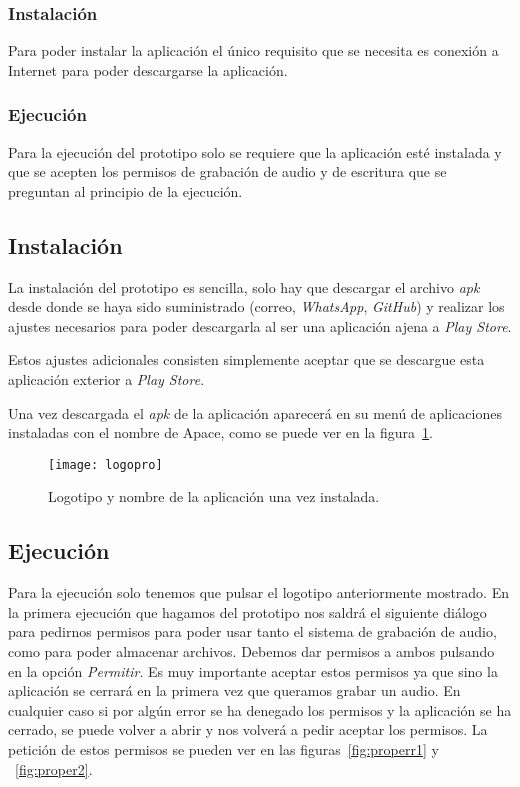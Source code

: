 \subsubsection{Instalación}
Para poder instalar la aplicación el único requisito que se necesita es conexión a Internet para poder descargarse la aplicación.

\subsubsection{Ejecución}
Para la ejecución del prototipo solo se requiere que la aplicación esté instalada y que se acepten los permisos de grabación de audio y de escritura que se preguntan al principio de la ejecución.

\subsection{Instalación}
La instalación del prototipo es sencilla, solo hay que descargar el archivo \textit{apk} desde donde se haya sido suministrado (correo, \textit{WhatsApp}, \textit{GitHub}) y realizar los ajustes necesarios para poder descargarla al ser una aplicación ajena a \textit{Play Store}.

Estos ajustes adicionales consisten simplemente aceptar que se descargue esta aplicación exterior a \textit{Play Store}.

Una vez descargada el \textit{apk} de la aplicación aparecerá en su menú de aplicaciones instaladas con el nombre de Apace, como se puede ver en la figura~\ref{fig:logopro}.

\begin{figure}[htp]
	\centering
	\texttt{[image: logopro]}
	\caption{Logotipo y nombre de la aplicación una vez instalada.}
	\label{fig:logopro}
\end{figure}

\subsection{Ejecución}
Para la ejecución solo tenemos que pulsar el logotipo anteriormente mostrado. En la primera ejecución que hagamos del prototipo nos saldrá el siguiente diálogo para pedirnos permisos para poder usar tanto el sistema de grabación de audio, como para poder almacenar archivos. Debemos dar permisos a ambos pulsando en la opción \textit{Permitir}. Es muy importante aceptar estos permisos ya que sino la aplicación se cerrará en la primera vez que queramos grabar un audio. En cualquier caso si por algún error se ha denegado los permisos y la aplicación se ha cerrado, se puede volver a abrir y nos volverá a pedir aceptar los permisos. La petición de estos permisos se pueden ver en las figuras~\ref{fig:properr1} y ~\ref{fig:proper2}.

